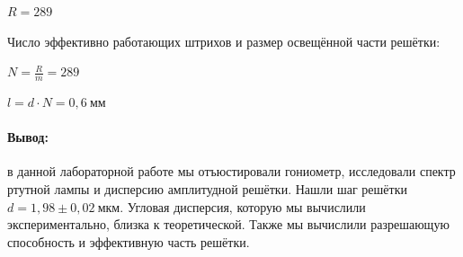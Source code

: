 \documentclass[a4paper,12pt]{article}
\begin{document}
\begin{center}
    $R= 289$
\end{center}

Число эффективно работающих штрихов и размер освещённой части решётки:

\begin{center}
    $N=\frac{R}{m}=289$
\end{center}

\begin{center}
    $l = d\cdot N=0,6~мм$
\end{center}
\paragraph{Вывод:} в данной лабораторной работе мы отъюстировали гониометр, исследовали спектр ртутной лампы и дисперсию амплитудной решётки. Нашли шаг решётки $d = 1,98\pm 0,02 ~ мкм$. Угловая дисперсия, которую мы вычислили экспериментально, близка к теоретической. Также мы вычислили разрешающую способность и эффективную часть решётки.
\end{document}
